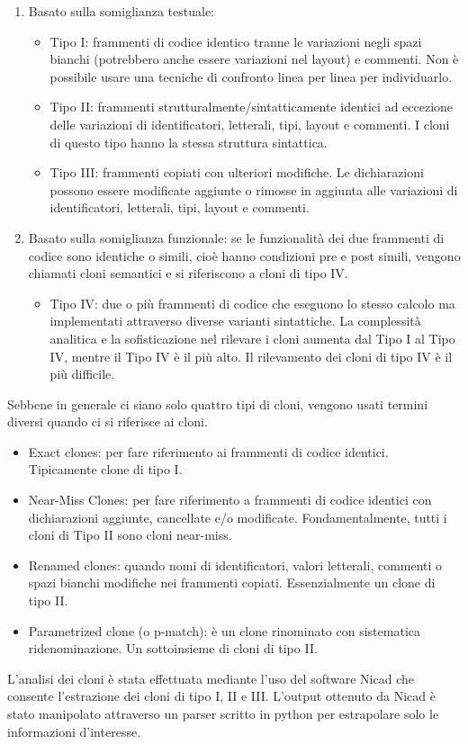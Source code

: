 \begin{enumerate}
\item Basato sulla somiglianza testuale:
\begin{itemize}
\item	Tipo I: frammenti di codice identico tranne le variazioni negli spazi bianchi (potrebbero anche essere variazioni nel layout) e commenti. Non è possibile usare una tecniche di confronto linea per linea per individuarlo.
\item	Tipo II: frammenti strutturalmente/sintatticamente identici ad eccezione delle variazioni di identificatori, letterali, tipi, layout e commenti. I cloni di questo tipo hanno la stessa struttura sintattica.
\item	Tipo III: frammenti copiati con ulteriori modifiche. Le dichiarazioni possono essere modificate aggiunte o rimosse in aggiunta alle variazioni di identificatori, letterali, tipi, layout e commenti.
\end{itemize}
\item Basato sulla somiglianza funzionale: se le funzionalità dei due frammenti di codice sono identiche o simili, cioè hanno condizioni pre e post simili, vengono chiamati cloni semantici e si riferiscono a cloni di tipo IV.
\begin{itemize}
\item	Tipo IV: due o più frammenti di codice che eseguono lo stesso calcolo ma implementati attraverso diverse varianti sintattiche. La complessità analitica e la sofisticazione nel rilevare i cloni aumenta dal Tipo I al Tipo IV, mentre il Tipo IV è il più alto. Il rilevamento dei cloni di tipo IV è il più difficile.
\end{itemize}
\end{enumerate}
Sebbene in generale ci siano solo quattro tipi di cloni, vengono usati termini diversi quando ci si riferisce ai cloni.
\begin{itemize}
\item	Exact clones: per fare riferimento ai frammenti di codice identici. Tipicamente clone di tipo I.
\item	Near-Miss Clones: per fare riferimento a frammenti di codice identici con dichiarazioni aggiunte, cancellate e/o modificate. Fondamentalmente, tutti i cloni di Tipo II sono cloni near-miss.
\item	Renamed clones: quando nomi di identificatori, valori letterali, commenti o spazi bianchi modifiche nei frammenti copiati. Essenzialmente un clone di tipo II.
\item	Parametrized clone (o p-match): è un clone rinominato con sistematica ridenominazione. Un sottoinsieme di cloni di tipo II.
\end{itemize}
L'analisi dei cloni è stata effettuata mediante l'uso del software Nicad che consente l'estrazione dei cloni di tipo I, II e III. L'output ottenuto da Nicad è stato manipolato attraverso un parser scritto in python per estrapolare solo le informazioni d'interesse.


